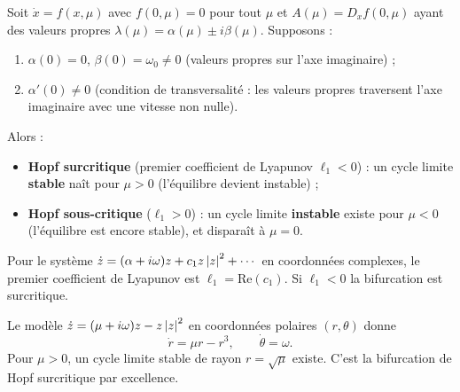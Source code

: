 \begin{theoreme}[Hopf]
\label{thm:hopf}
Soit $\dot{x} = f(x, \mu)$ avec $f(0, \mu) = 0$ pour tout $\mu$ et
$A(\mu) = D_x f(0, \mu)$ ayant des valeurs propres
$\lambda(\mu) = \alpha(\mu) \pm i\beta(\mu)$. Supposons :
\begin{enumerate}
    \item $\alpha(0) = 0$, $\beta(0) = \omega_0 \neq 0$
    (valeurs propres sur l'axe imaginaire) ;
    \item $\alpha'(0) \neq 0$ (condition de transversalit\'e : les valeurs
    propres traversent l'axe imaginaire avec une vitesse non nulle).
\end{enumerate}
Alors :
\begin{itemize}
    \item \textbf{Hopf surcritique} (premier coefficient de Lyapunov $\ell_1 < 0$) :
    un cycle limite \textbf{stable} na\^it pour $\mu > 0$ (l'\'equilibre
    devient instable) ;
    \item \textbf{Hopf sous-critique} ($\ell_1 > 0$) :
    un cycle limite \textbf{instable} existe pour $\mu < 0$ (l'\'equilibre
    est encore stable), et dispara\^it \`a $\mu = 0$.
\end{itemize}
\end{theoreme}

\begin{formules}[title=\textbf{Premier coefficient de Lyapunov}]
Pour le syst\`eme $\dot{z} = (\alpha + i\omega)z + c_1 z\left| z \right|^2 + \cdots$
en coordonn\'ees complexes, le premier coefficient de Lyapunov est
$\ell_1 = \text{Re}(c_1)$. Si $\ell_1 < 0$ la bifurcation est surcritique.
\end{formules}

\begin{exemple}
Le mod\`ele $\dot{z} = (\mu + i\omega)z - z\left| z \right|^2$ en coordonn\'ees
polaires $(r, \theta)$ donne
\[
    \dot{r} = \mu r - r^3, \qquad \dot{\theta} = \omega.
\]
Pour $\mu > 0$, un cycle limite stable de rayon $r = \sqrt{\mu}$ existe.
C'est la bifurcation de Hopf surcritique par excellence.
\end{exemple}

